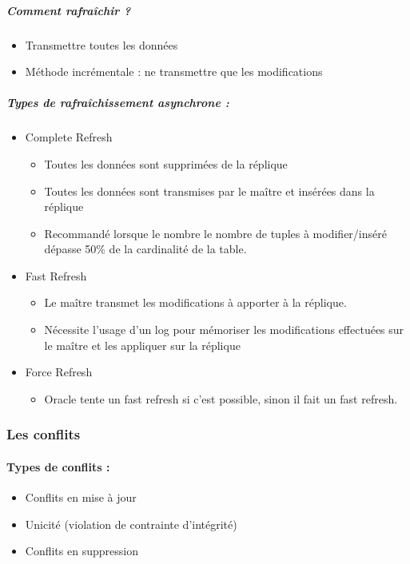 \documentclass[10pt,a4paper,twoside]{article}
\begin{document}
\subparagraph{Comment rafraîchir ?}
\begin{itemize}
\item Transmettre toutes les données
\item Méthode incrémentale : ne transmettre que les modifications
\end{itemize}

\subparagraph{Types de rafraîchissement asynchrone :}
\begin{itemize}
\item Complete Refresh
\begin{itemize}
\item Toutes les données sont supprimées de la réplique
\item Toutes les données sont transmises par le maître et insérées dans la réplique
\item Recommandé lorsque le nombre le nombre de tuples à modifier/inséré dépasse 50\% de la cardinalité de la table.
\end{itemize}
\item Fast Refresh
\begin{itemize}
\item Le maître transmet les modifications à apporter à la réplique.
\item Nécessite l'usage d'un log pour mémoriser les modifications effectuées sur le maître et les appliquer sur la réplique
\end{itemize}
\item Force Refresh
\begin{itemize}
\item Oracle tente un fast refresh si c'est possible, sinon il fait un fast refresh.
\end{itemize}
\end{itemize}

\subsubsection{Les conflits}

\paragraph{Types de conflits :}
\begin{itemize}
\item Conflits en mise à jour
\item Unicité (violation de contrainte d'intégrité)
\item Conflits en suppression
\end{itemize}
\end{document}
